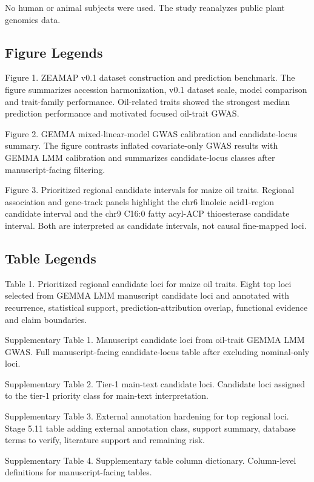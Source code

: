 \documentclass[
]{article}
\begin{document}
No human or animal subjects were used. The study reanalyzes public plant
genomics data.

\subsection{Figure Legends}\label{figure-legends}

Figure 1. ZEAMAP v0.1 dataset construction and prediction benchmark. The
figure summarizes accession harmonization, v0.1 dataset scale, model
comparison and trait-family performance. Oil-related traits showed the
strongest median prediction performance and motivated focused oil-trait
GWAS.

Figure 2. GEMMA mixed-linear-model GWAS calibration and candidate-locus
summary. The figure contrasts inflated covariate-only GWAS results with
GEMMA LMM calibration and summarizes candidate-locus classes after
manuscript-facing filtering.

Figure 3. Prioritized regional candidate intervals for maize oil traits.
Regional association and gene-track panels highlight the chr6 linoleic
acid1-region candidate interval and the chr9 C16:0 fatty acyl-ACP
thioesterase candidate interval. Both are interpreted as candidate
intervals, not causal fine-mapped loci.

\subsection{Table Legends}\label{table-legends}

Table 1. Prioritized regional candidate loci for maize oil traits. Eight
top loci selected from GEMMA LMM manuscript candidate loci and annotated
with recurrence, statistical support, prediction-attribution overlap,
functional evidence and claim boundaries.

Supplementary Table 1. Manuscript candidate loci from oil-trait GEMMA
LMM GWAS. Full manuscript-facing candidate-locus table after excluding
nominal-only loci.

Supplementary Table 2. Tier-1 main-text candidate loci. Candidate loci
assigned to the tier-1 priority class for main-text interpretation.

Supplementary Table 3. External annotation hardening for top regional
loci. Stage 5.11 table adding external annotation class, support
summary, database terms to verify, literature support and remaining
risk.

Supplementary Table 4. Supplementary table column dictionary.
Column-level definitions for manuscript-facing tables.
\end{document}

